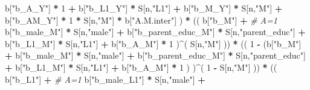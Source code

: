 \documentclass[
]{book}
\newenvironment{Shaded}{\begin{snugshade}}{\end{snugshade}}
\newcommand{\CommentTok}[1]{\textcolor[rgb]{0.56,0.35,0.01}{\textit{#1}}}
\newcommand{\DecValTok}[1]{\textcolor[rgb]{0.00,0.00,0.81}{#1}}
\newcommand{\NormalTok}[1]{#1}
\newcommand{\SpecialCharTok}[1]{\textcolor[rgb]{0.81,0.36,0.00}{\textbf{#1}}}
\newcommand{\StringTok}[1]{\textcolor[rgb]{0.31,0.60,0.02}{#1}}
\begin{document}
\begin{Shaded}
\begin{Highlighting}[]
\NormalTok{                             b[}\StringTok{"b\_A\_Y"}\NormalTok{] }\SpecialCharTok{*} \DecValTok{1} \SpecialCharTok{+} 
\NormalTok{                             b[}\StringTok{"b\_L1\_Y"}\NormalTok{] }\SpecialCharTok{*}\NormalTok{ S[n,}\StringTok{"L1"}\NormalTok{] }\SpecialCharTok{+}
\NormalTok{                             b[}\StringTok{"b\_M\_Y"}\NormalTok{] }\SpecialCharTok{*}\NormalTok{ S[n,}\StringTok{"M"}\NormalTok{] }\SpecialCharTok{+}
\NormalTok{                             b[}\StringTok{"b\_AM\_Y"}\NormalTok{] }\SpecialCharTok{*} \DecValTok{1} \SpecialCharTok{*}\NormalTok{ S[n,}\StringTok{"M"}\NormalTok{] }\SpecialCharTok{*}\NormalTok{ b[}\StringTok{"A.M.inter"}\NormalTok{] ) }\SpecialCharTok{*}
\NormalTok{      (( b[}\StringTok{"b\_M"}\NormalTok{] }\SpecialCharTok{+}                                                             \CommentTok{\# A\textquotesingle{}=1}
\NormalTok{           b[}\StringTok{"b\_male\_M"}\NormalTok{] }\SpecialCharTok{*}\NormalTok{ S[n,}\StringTok{"male"}\NormalTok{] }\SpecialCharTok{+} 
\NormalTok{           b[}\StringTok{"b\_parent\_educ\_M"}\NormalTok{] }\SpecialCharTok{*}\NormalTok{ S[n,}\StringTok{"parent\_educ"}\NormalTok{] }\SpecialCharTok{+} 
\NormalTok{           b[}\StringTok{"b\_L1\_M"}\NormalTok{] }\SpecialCharTok{*}\NormalTok{ S[n,}\StringTok{"L1"}\NormalTok{] }\SpecialCharTok{+}
\NormalTok{           b[}\StringTok{"b\_A\_M"}\NormalTok{] }\SpecialCharTok{*} \DecValTok{1}\NormalTok{ )}\SpecialCharTok{\^{}}\NormalTok{( S[n,}\StringTok{"M"}\NormalTok{] )) }\SpecialCharTok{*}
\NormalTok{      (( }\DecValTok{1} \SpecialCharTok{{-}}\NormalTok{ (b[}\StringTok{"b\_M"}\NormalTok{] }\SpecialCharTok{+} 
\NormalTok{                b[}\StringTok{"b\_male\_M"}\NormalTok{] }\SpecialCharTok{*}\NormalTok{ S[n,}\StringTok{"male"}\NormalTok{] }\SpecialCharTok{+} 
\NormalTok{                b[}\StringTok{"b\_parent\_educ\_M"}\NormalTok{] }\SpecialCharTok{*}\NormalTok{ S[n,}\StringTok{"parent\_educ"}\NormalTok{] }\SpecialCharTok{+} 
\NormalTok{                b[}\StringTok{"b\_L1\_M"}\NormalTok{] }\SpecialCharTok{*}\NormalTok{ S[n,}\StringTok{"L1"}\NormalTok{] }\SpecialCharTok{+}
\NormalTok{                b[}\StringTok{"b\_A\_M"}\NormalTok{] }\SpecialCharTok{*} \DecValTok{1}\NormalTok{ ) )}\SpecialCharTok{\^{}}\NormalTok{( }\DecValTok{1} \SpecialCharTok{{-}}\NormalTok{ S[n,}\StringTok{"M"}\NormalTok{] )) }\SpecialCharTok{*}
\NormalTok{      (( b[}\StringTok{"b\_L1"}\NormalTok{] }\SpecialCharTok{+}                                                            \CommentTok{\# A=1}
\NormalTok{           b[}\StringTok{"b\_male\_L1"}\NormalTok{] }\SpecialCharTok{*}\NormalTok{ S[n,}\StringTok{"male"}\NormalTok{] }\SpecialCharTok{+}  

\end{Highlighting}
\end{Shaded}
\end{document}
